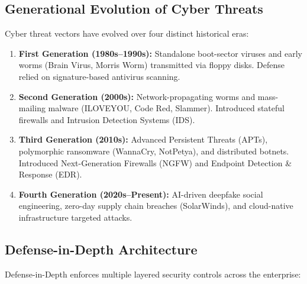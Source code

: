 \documentclass[12pt,a4paper]{article}
\begin{document}
\subsection{Generational Evolution of Cyber Threats}
Cyber threat vectors have evolved over four distinct historical eras:
\begin{enumerate}[leftmargin=*, itemsep=4pt]
  \item \textbf{First Generation (1980s--1990s):} Standalone boot-sector viruses and early worms (Brain Virus, Morris Worm) transmitted via floppy disks. Defense relied on signature-based antivirus scanning.
  \item \textbf{Second Generation (2000s):} Network-propagating worms and mass-mailing malware (ILOVEYOU, Code Red, Slammer). Introduced stateful firewalls and Intrusion Detection Systems (IDS).
  \item \textbf{Third Generation (2010s):} Advanced Persistent Threats (APTs), polymorphic ransomware (WannaCry, NotPetya), and distributed botnets. Introduced Next-Generation Firewalls (NGFW) and Endpoint Detection \& Response (EDR).
  \item \textbf{Fourth Generation (2020s--Present):} AI-driven deepfake social engineering, zero-day supply chain breaches (SolarWinds), and cloud-native infrastructure targeted attacks.
\end{enumerate}

\subsection{Defense-in-Depth Architecture}
Defense-in-Depth enforces multiple layered security controls across the enterprise:

\begin{tcolorbox}[tikzbox, title={Defense-in-Depth Layered Model}]
\centering
{}
\end{tcolorbox}
\end{document}
